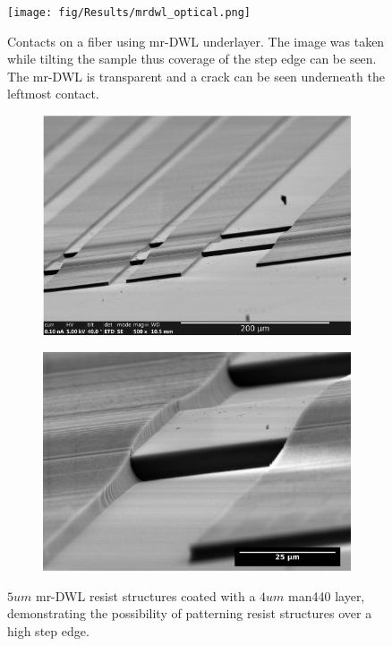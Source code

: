 \begin{figure}
    \centering
    \texttt{[image: fig/Results/mrdwl\_optical.png]}
    \caption{Contacts on a fiber using mr-DWL underlayer. The image was taken while tilting the sample thus coverage of the step edge can be seen. The mr-DWL is transparent and a crack can be seen underneath the leftmost contact.}
    \label{mrdwl-butterfly}
\end{figure}

 \begin{figure}[htb]
\centering
\begin{subfigure}{\textwidth}
  \centering
  \includegraphics[width=\linewidth]{fig/mr-DWL/sem_mr-dwl-2.jpg}
 
\end{subfigure}%

\begin{subfigure}{\textwidth}
  \centering
  \includegraphics[width=\linewidth]{fig/mr-DWL/sem_mr-dwl_zoom4.jpg}
 
\end{subfigure}
\caption{$5um$ mr-DWL resist structures coated with a $4um$ man440 layer, demonstrating the possibility of patterning resist structures over a high step edge. }
\label{mrdwl-si}
\end{figure}
